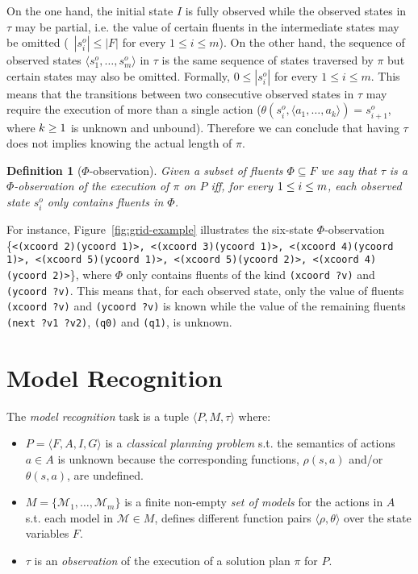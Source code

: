 \documentclass[letterpaper]{article} %
\newcommand{\tup}[1]{{\langle #1 \rangle}}
\newtheorem{definition}[theorem]{Definition}
\begin{document}
On the one hand, the initial state $I$ is fully observed while the observed states in $\tau$ may be partial, i.e. the value of certain fluents in the intermediate states may be omitted (~$|s_i^o|\leq |F|$ for every $1\leq i\leq m$). On the other hand, the sequence of observed states $\tup{s_1^o, \ldots, s_m^o}$ in $\tau$ is the same sequence of states traversed by $\pi$ but certain states may also be omitted. Formally, $0\leq|s_i^o|$ for every $1\leq i\leq m$. This means that the transitions between two consecutive observed states in $\tau$ may require the execution of more than a single action ($\theta(s_i^o,\tup{a_1,\ldots,a_k})=s_{i+1}^o$, where ${\small k\geq 1}$ is unknown and unbound). Therefore we can conclude that having $\tau$ does not implies knowing the actual length of $\pi$.

\begin{definition}[$\Phi$-observation]
Given a subset of fluents $\Phi\subseteq F$ we say that $\tau$ is a $\Phi$-observation of the execution of $\pi$ on $P$ iff, for every ${\small 1\leq i\leq m}$, each observed state $s_i^o$ only contains fluents in $\Phi$.
\end{definition}

For instance, Figure~\ref{fig:grid-example} illustrates the six-state $\Phi$-observation \{{\tt\footnotesize<(xcoord 2)(ycoord 1)>, <(xcoord 3)(ycoord 1)>, <(xcoord 4)(ycoord 1)>, <(xcoord 5)(ycoord 1)>, <(xcoord 5)(ycoord 2)>, <(xcoord 4)(ycoord 2)>}\}, where $\Phi$ only contains fluents of the kind {\tt\small (xcoord ?v)} and {\tt\small (ycoord ?v)}. This means that, for each observed state, only the value of fluents {\tt\small (xcoord ?v)} and {\tt\small (ycoord ?v)} is known while the value of the remaining fluents {\tt\small (next ?v1 ?v2)}, {\tt\small (q0)} and {\tt\small (q1)}, is unknown.



\section{Model Recognition}
\label{sec:recognition}
The {\em model recognition} task is a tuple $\tup{P,M,\tau}$ where:
\begin{itemize}
\item $P=\tup{F,A,I,G}$ is a {\em classical planning problem} s.t. the semantics of actions $a\in A$ is unknown because the corresponding functions, $\rho(s,a)$ and/or $\theta(s,a)$, are undefined.
\item $M=\{\mathcal{M}_1,\ldots,\mathcal{M}_m\}$ is a finite non-empty {\em set of models} for the actions in $A$ s.t. each model in $\mathcal{M}\in M$, defines different function pairs $\tup{\rho,\theta}$ over the state variables $F$.
\item $\tau$ is an {\em observation} of the execution of a solution plan $\pi$ for $P$.
\end{itemize}
\end{document}
